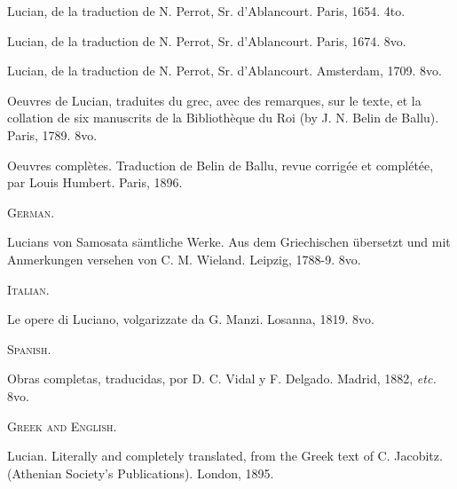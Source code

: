 \documentclass[a4paper, 11pt, oneside, polutonikogreek, english]{article}
\begin{document}
Lucian, de la traduction de N. Perrot, Sr. d'Ablancourt. Paris, 1654. 4to.

Lucian, de la traduction de N. Perrot, Sr. d'Ablancourt. Paris, 1674. 8vo.

Lucian, de la traduction de N. Perrot, Sr. d'Ablancourt. Amsterdam, 1709. 8vo.

Oeuvres de Lucian, traduites du grec, avec des remarques, sur le texte, et la collation de six manuscrits de la Bibliothèque du Roi (by J. N. Belin de Ballu). Paris, 1789. 8vo.

Oeuvres complètes. Traduction de Belin de Ballu, revue corrigée et complétée, par Louis Humbert. Paris, 1896.

\begin{center}
\textsc{German.}
\end{center}

Lucians von Samosata sämtliche Werke. Aus dem Griechischen übersetzt und mit Anmerkungen versehen von C. M. Wieland. Leipzig, 1788-9. 8vo.

\begin{center}
\textsc{Italian.}
\end{center}

Le opere di Luciano, volgarizzate da G. Manzi. Losanna, 1819. 8vo.

\begin{center}
\textsc{Spanish.}
\end{center}

Obras completas, traducidas, por D. C. Vidal y F. Delgado. Madrid, 1882, \emph{etc.} 8vo.

\begin{center}
\textsc{Greek and English.}
\end{center}

Lucian. Literally and completely translated, from the Greek text of C. Jacobitz. (Athenian Society's Publications). London, 1895.
\end{document}
